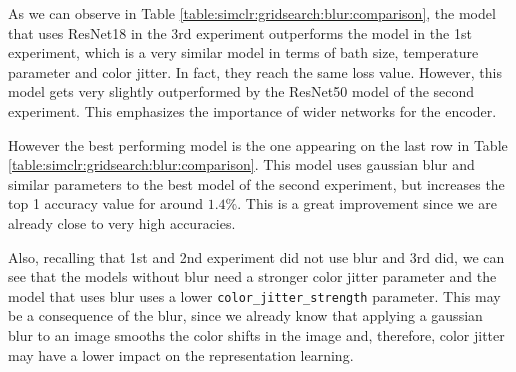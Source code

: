     \begin{table}[H]
        \caption{Comparison of the results of the third experiment with the best results of the two previous experiments.}
        \label{table:simclr:gridsearch:blur:comparison}
        \end{table}

As we can observe in Table \ref{table:simclr:gridsearch:blur:comparison}, the model that uses ResNet18 in the 3rd experiment outperforms the model in the 1st experiment, which is a very similar model in terms of bath size, temperature parameter and color jitter. In fact, they reach the same loss value. However, this model gets very slightly outperformed by the ResNet50 model of the second experiment. This emphasizes the importance of wider networks for the encoder. 

However the best performing model is the one appearing on the last row in Table \ref{table:simclr:gridsearch:blur:comparison}. This model uses gaussian blur and similar parameters to the best model of the second experiment, but increases the top 1 accuracy value for around $1.4\%$. This is a great improvement since we are already close to very high accuracies.  

Also, recalling that 1st and 2nd experiment did not use blur and 3rd did, we can see that the models without blur need a stronger color jitter parameter and the model that uses blur uses a lower \lstinline{color_jitter_strength} parameter. This may be a consequence of the blur, since we already know that applying a gaussian blur to an image smooths the color shifts in the image and, therefore, color jitter may have a lower impact on the representation learning.


